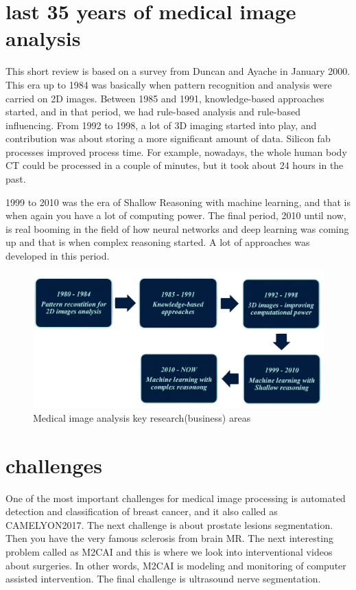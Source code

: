 \section{last 35 years of medical image analysis}
This short review is based on a survey from Duncan and Ayache in January 2000. This era up to 1984 was basically when pattern recognition and analysis were carried on 2D images. Between 1985 and 1991, knowledge-based approaches started, and in that period, we had rule-based analysis and rule-based influencing. From 1992 to 1998, a lot of 3D imaging started into play, and contribution was about storing a more significant amount of data. Silicon fab processes improved process time. For example, nowadays, the whole human body CT could be processed in a couple of minutes, but it took about 24 hours in the past. 

1999 to 2010 was the era of Shallow Reasoning with machine learning, and that is when again you have a lot of computing power. The final period, 2010 until now, is real booming in the field of how neural networks and deep learning was coming up and that is when complex reasoning started. A lot of approaches was developed in this period.

\begin{figure}[htbp]
	\includegraphics[width=1\columnwidth]{./figures/Fig5.png}
	\caption{Medical image analysis key research(business) areas}
	\label{fig5}
\end{figure}


\section{challenges}

One of the most important challenges for medical image processing is automated detection and classification of breast cancer, and it also called as CAMELYON2017. The next challenge is about prostate lesions segmentation. Then you have the very famous sclerosis from brain MR. The next interesting problem called as M2CAI and this is where we look into interventional videos about surgeries. In other words, M2CAI is modeling and monitoring of computer assisted intervention. The final challenge is ultrasound nerve segmentation.